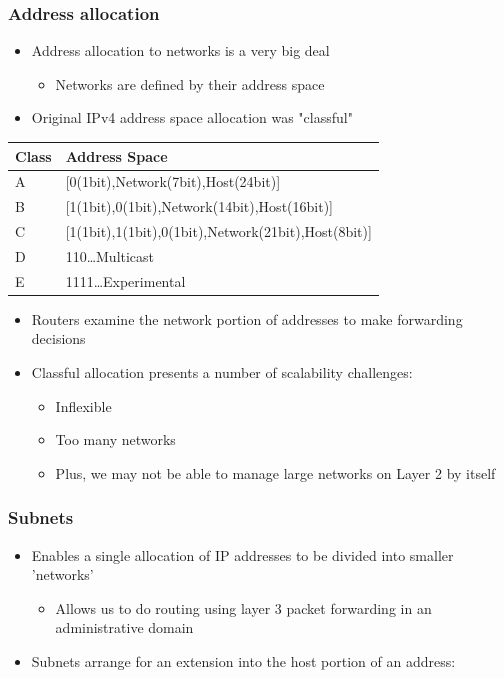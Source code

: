 \documentclass[11pt]{article}
\begin{document}
\subsubsection{Address allocation}
\label{sec:orgheadline55}
\begin{itemize}
\item Address allocation to networks is a very big deal
\begin{itemize}
\item Networks are defined by their address space
\end{itemize}
\item Original IPv4 address space allocation was "classful"
\end{itemize}

\begin{center}
\begin{tabular}{ll}
\hline
Class & Address Space\\
\hline
A & [0(1bit),Network(7bit),Host(24bit)]\\
B & [1(1bit),0(1bit),Network(14bit),Host(16bit)]\\
C & [1(1bit),1(1bit),0(1bit),Network(21bit),Host(8bit)]\\
D & 110\ldots{}Multicast\\
E & 1111\ldots{}Experimental\\
\hline
\end{tabular}
\end{center}

\begin{itemize}
\item Routers examine the network portion of addresses to make forwarding
decisions
\item Classful allocation presents a number of scalability challenges:
\begin{itemize}
\item Inflexible
\item Too many networks
\item Plus, we may not be able to manage large networks on Layer 2 by
itself
\end{itemize}
\end{itemize}

\subsubsection{Subnets}
\label{sec:orgheadline56}
\begin{itemize}
\item Enables a single allocation of IP addresses to be divided into
smaller 'networks'
\begin{itemize}
\item Allows us to do routing using layer 3 packet forwarding in an
administrative domain
\end{itemize}
\item Subnets arrange for an extension into the host portion of an
address:
\end{itemize}
\end{document}
